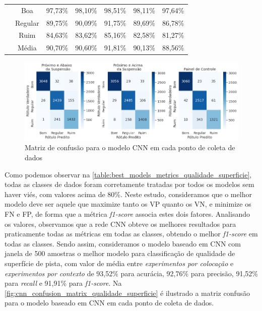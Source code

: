 \begin{table}[H]
\begin{tabular}{ccccccc}
  & Boa     & 97,73\% & 98,10\% & \cellcolor[HTML]{34FF34}98,51\% & 98,11\% & 97,64\% \\ \cmidrule{2-7} 
 & Regular  & 89,75\% & 90,09\% & \cellcolor[HTML]{34FF34}91,75\% & 89,69\% & 86,78\% \\ \cmidrule{2-7} 
 & Ruim     & 84,63\% & 83,62\% & \cellcolor[HTML]{34FF34}85,16\% & 82,58\% & 81,27\% \\ \cmidrule{2-7} 
 & Média    & 90,70\% & 90,60\% & \cellcolor[HTML]{34FF34}91,81\% & 90,13\% & 88,56\% \\ \bottomrule
\end{tabular}
\end{table}

\begin{figure}[H]
  \centering
  \caption{Matriz de confusão para o modelo CNN em cada ponto de coleta de dados}
  \label{fig:cnn_confusion_matrix_qualidade_superficie}
  \includegraphics[width=1\textwidth]{figuras/fig_51.png}
\end{figure}

Como podemos observar na \autoref{table:best_models_metrics_qualidade_superficie}, todas as classes de dados foram corretamente tratadas por todos os modelos sem haver viés, com valores acima de 80\%. Neste estudo, consideramos que o melhor modelo deve ser aquele que maximize tanto os VP quanto os VN, e minimize os FN e FP, de forma que a métrica \textit{f1-score} associa estes dois fatores. Analisando os valores, observamos que a rede CNN obteve os melhores resultados para praticamente todas as métricas em todas as classes, obtendo o melhor \textit{f1-score} em todas as classes. Sendo assim, consideramos o modelo baseado em CNN com janela de 500 amostras o melhor modelo para classificação de qualidade de superfície de pista, com valor de média entre \emph{experimentos por colocação} e \emph{experimentos por contexto} de 93,52\% para acurácia, 92,76\% para precisão, 91,52\% para \textit{recall} e 91,91\% para \textit{f1-score}. Na \autoref{fig:cnn_confusion_matrix_qualidade_superficie} é ilustrado a matriz confusão para o modelo baseado em CNN em cada ponto de coleta de dados.

